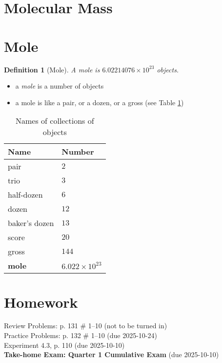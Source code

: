 \documentclass[11pt, oneside]{article}   	%
\newtheorem{definition}{Definition}
\begin{document}
\section{Molecular Mass}


\section{Mole}

\begin{definition}[Mole]\label{defn:mole}
A mole is $6.02214076 \times 10^{23}$  objects.
\end{definition}

\begin{itemize}
\item a \emph{mole} is a number of objects
\item a mole is like a pair, or a dozen, or a gross (see Table \ref{table:collections:names})

\end{itemize}

\begin{table}[p]
\centering
\begin{tabular}[b]{l|l}
\hline
Name & Number \\
\hline
pair  & $2$ \\
trio  & $3$ \\ 
half-dozen & $6$ \\
dozen & $12$ \\
baker's dozen & $13$ \\
score & $20$ \\
gross & $144$ \\
\textbf{mole}   & \textbf{$6.022 \times 10^{23}$}\\
\end{tabular}
\caption{Names of collections of objects}
\label{table:collections:names}
\end{table}





\section{Homework}
Review Problems: p. 131 \# 1--10 (not to be turned in)\\
Practice Problems: p. 132 \# 1--10 (due 2025-10-24)\\
Experiment 4.3, p. 110 (due 2025-10-10)\\
\textbf{Take-home Exam: Quarter 1 Cumulative Exam} (due 2025-10-10) \\



\nocite{wile-chem-2}
{}

\end{document}
